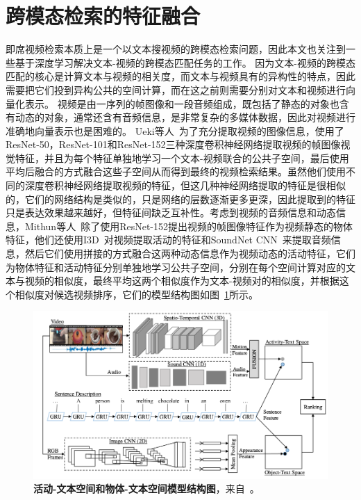 \section{跨模态检索的特征融合}
即席视频检索本质上是一个以文本搜视频的跨模态检索问题，因此本文也关注到一些基于深度学习解决文本-视频的跨模态匹配任务的工作。
因为文本-视频的跨模态匹配的核心是计算文本与视频的相关度，而文本与视频具有的异构性的特点，因此需要把它们投到异构公共的空间计算，而在这之前则需要分别对文本和视频进行向量化表示。
视频是由一序列的帧图像和一段音频组成，既包括了静态的对象也含有动态的对象，通常还含有音频信息，是非常复杂的多媒体数据，因此对视频进行准确地向量表示也是困难的。
Ueki等人~\cite{ueki2019waseda}为了充分提取视频的图像信息，使用了ResNet-50，ResNet-101和ResNet-152三种深度卷积神经网络提取视频的帧图像视觉特征，并且为每个特征单独地学习一个文本-视频联合的公共子空间，最后使用平均后融合的方式融合这些子空间从而得到最终的视频检索结果。虽然他们使用不同的深度卷积神经网络提取视频的特征，但这几种神经网络提取的特征是很相似的，它们的网络结构是类似的，只是网络的层数逐渐更多更深，因此提取到的特征只是表达效果越来越好，但特征间缺乏互补性。考虑到视频的音频信息和动态信息，Mithun等人~\cite{mithun2018learning}除了使用ResNet-152提出视频的帧图像特征作为视频静态的物体特征，他们还使用I3D~\cite{carreira2017quo}对视频提取活动的特征和SoundNet CNN~\cite{aytar2016soundnet}来提取音频信息，然后它们使用拼接的方式融合这两种动态信息作为视频动态的活动特征，它们为物体特征和活动特征分别单独地学习公共子空间，分别在每个空间计算对应的文本与视频的相似度，最终平均这两个相似度作为文本-视频对的相似度，并根据这个相似度对候选视频排序，它们的模型结构图如图~\ref{fig:related_mithun2018}所示。

\begin{figure}[tbh!]
    \centering
    \includegraphics[width=\linewidth]{figures/related_mithun2018}
    \caption[Mithun等人~\cite{mithun2018learning}的活动-文本空间和物体-文本空间模型结构图]{\textbf{活动-文本空间和物体-文本空间模型结构图}，来自~\cite{mithun2018learning}。}
    \label{fig:related_mithun2018}
\end{figure}

